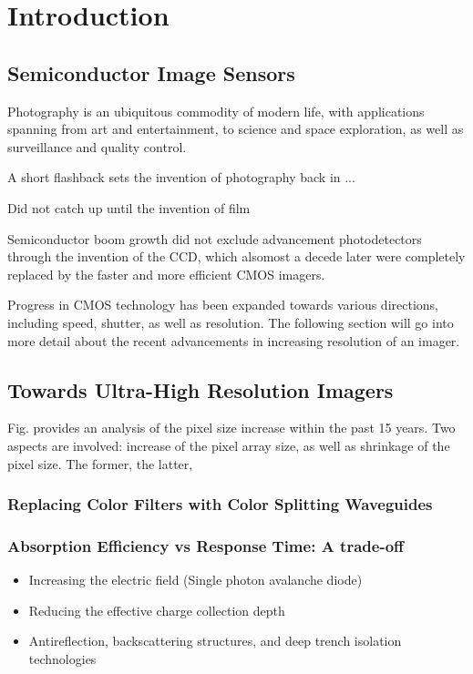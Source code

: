 \chapter{Introduction}\label{ch:introduction}

\instructionsintroduction
\section{Semiconductor Image Sensors}

Photography is an ubiquitous commodity of modern life, with applications spanning from art and entertainment, to science and space exploration, as well as surveillance and quality control.  

A short flashback sets the invention of photography back in ... 

Did not catch up until the invention of film 

Semiconductor boom growth did not exclude advancement photodetectors through the invention of the CCD, which alsomost a decede later were completely replaced by the faster and more efficient CMOS imagers. 

Progress in CMOS technology has been expanded towards various directions, including speed, shutter, as well as resolution. The following section will go into more detail about the recent advancements in increasing resolution of an imager.


\section{Towards Ultra-High Resolution Imagers}


Fig. provides an analysis of the pixel size increase within the past 15 years. 
Two aspects are involved: increase of the pixel array size, as well as shrinkage of the pixel size. The former, the latter, 




\subsection{Replacing Color Filters with Color Splitting Waveguides}
\subsection{Absorption Efficiency vs Response Time: A trade-off}

\begin{itemize}
    \item Increasing the electric field (Single photon avalanche diode)
    \item Reducing the effective charge collection depth
    \item Antireflection, backscattering structures, and deep trench isolation technologies
\end{itemize}

